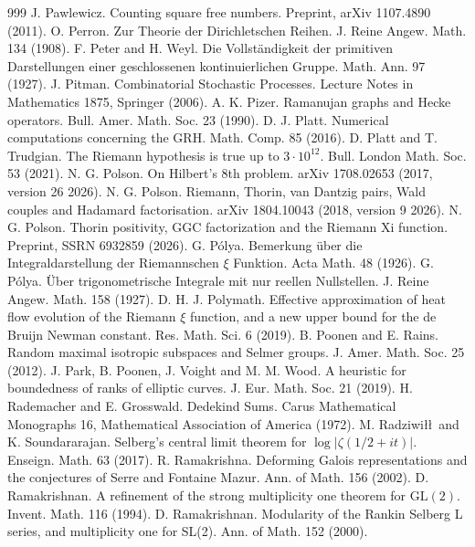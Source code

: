 \begin{thebibliography}{999}
 J. Pawlewicz. Counting square free numbers. Preprint, arXiv 1107.4890 (2011).
 O. Perron. Zur Theorie der Dirichletschen Reihen. J. Reine Angew. Math. 134 (1908).
 F. Peter and H. Weyl. Die Vollst\"andigkeit der primitiven Darstellungen einer geschlossenen kontinuierlichen Gruppe. Math. Ann. 97 (1927).
 J. Pitman. Combinatorial Stochastic Processes. Lecture Notes in Mathematics 1875, Springer (2006).
 A. K. Pizer. Ramanujan graphs and Hecke operators. Bull. Amer. Math. Soc. 23 (1990).
 D. J. Platt. Numerical computations concerning the GRH. Math. Comp. 85 (2016).
 D. Platt and T. Trudgian. The Riemann hypothesis is true up to $3\cdot10^{12}$. Bull. London Math. Soc. 53 (2021).
 N. G. Polson. On Hilbert's 8th problem. arXiv 1708.02653 (2017, version 26 2026).
 N. G. Polson. Riemann, Thorin, van Dantzig pairs, Wald couples and Hadamard factorisation. arXiv 1804.10043 (2018, version 9 2026).
 N. G. Polson. Thorin positivity, GGC factorization and the Riemann Xi function. Preprint, SSRN 6932859 (2026).
 G. P\'olya. Bemerkung \"uber die Integraldarstellung der Riemannschen $\xi$ Funktion. Acta Math. 48 (1926).
 G. P\'olya. \"Uber trigonometrische Integrale mit nur reellen Nullstellen. J. Reine Angew. Math. 158 (1927).
 D. H. J. Polymath. Effective approximation of heat flow evolution of the Riemann $\xi$ function, and a new upper bound for the de Bruijn Newman constant. Res. Math. Sci. 6 (2019).
 B. Poonen and E. Rains. Random maximal isotropic subspaces and Selmer groups. J. Amer. Math. Soc. 25 (2012).
 J. Park, B. Poonen, J. Voight and M. M. Wood. A heuristic for boundedness of ranks of elliptic curves. J. Eur. Math. Soc. 21 (2019).
 H. Rademacher and E. Grosswald. Dedekind Sums. Carus Mathematical Monographs 16, Mathematical Association of America (1972).
 M. Radziwi\l\l\ and K. Soundararajan. Selberg's central limit theorem for $\log|\zeta(1/2+it)|$. Enseign. Math. 63 (2017).
 R. Ramakrishna. Deforming Galois representations and the conjectures of Serre and Fontaine Mazur. Ann. of Math. 156 (2002).
 D. Ramakrishnan. A refinement of the strong multiplicity one theorem for $\mathrm{GL}(2)$. Invent. Math. 116 (1994).
 D. Ramakrishnan. Modularity of the Rankin Selberg L series, and multiplicity one for SL(2). Ann. of Math. 152 (2000).

\end{thebibliography}
